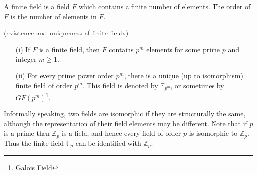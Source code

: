 \begin{mydef} 
	A finite field is a field $F$ which contains a finite number of elements. The order of $F$ is the number of elements in $F$. \end{mydef}

\begin{myprop}
	(existence and uniqueness of finite fields)
	\begin{itemize}
		\item[(i)] If $F$ is a finite field, then $F$ contains $p^m$ elements for some prime $p$ and integer $m \geq 1$.
		\item[(ii)] For every prime power order $p^m$, there is a unique (up to isomorphism) finite field of order $p^m$. This field is denoted by $\mathbb{F}_{p^m}$, or sometimes by $GF(p^m)$\footnote{Galois Field}.
	\end{itemize}
	Informally speaking, two fields are isomorphic if they are structurally the same, although the representation of their field elements may be different. Note that if $p$ is a prime then $\mathbb{Z}_p$ is a field, and hence every field of order $p$ is isomorphic to $\mathbb{Z}_p$. Thus the finite field $\mathbb{F}_p$ can be identified with $\mathbb{Z}_p$.
\end{myprop}